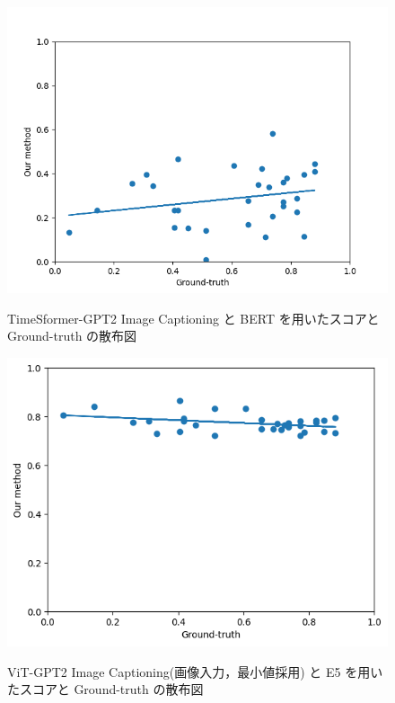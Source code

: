 \documentclass[11pt,a4j]{jreport}
\begin{document}
\begin{figure}[ht]
    \centering
    \begin{minipage}[c]{0.5\hsize}
        \centering
        \label{tab:leftfigure}
        \includegraphics[width=\linewidth]{vid_corr.png}
        \caption{TimeSformer-GPT2 Image Captioning と BERT を用いたスコアと Ground-truth の散布図}
        \label{fig:vid-corr}
    \end{minipage}
    \begin{minipage}[c]{0.45\hsize}
        \centering
        \label{tab:rightfigure}
        \includegraphics[width=\linewidth]{min_corr.png}
        \caption{ViT-GPT2 Image Captioning(画像入力，最小値採用) と E5 を用いたスコアと Ground-truth の散布図}
        \label{fig:min-corr}
    \end{minipage}
\end{figure}
\end{document}

